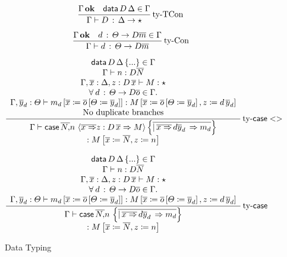 \begin{figure}
\[
\frac{\Gamma\,\mathbf{ok}\quad\mathsf{data}\,D\,\Delta\in\Gamma}{\Gamma\vdash D\,:\,\Delta\rightarrow\star}\operatorname{ty-TCon}
\]

\[
\frac{\Gamma\,\mathbf{ok}\quad d\,:\,\varTheta\rightarrow D\overline{m}\in\Gamma}{\Gamma\vdash d\,:\,\varTheta\rightarrow D\overline{m}}\operatorname{ty-Con}
\]

\[
\frac{\begin{array}{c}
\mathsf{data}\,D\,\Delta\left\{ ...\right\} \in\Gamma\\
\Gamma\vdash n:D\overline{N}\\
\Gamma,\overline{x}:\Delta,z:D\,\overline{x}\vdash M:\star\\
\forall\:d\,:\,\varTheta\rightarrow D\overline{o}\in\Gamma.\\
\Gamma,\overline{y}_{d}:\varTheta\vdash m_{d}\left[\overline{x}\coloneqq\overline{o}\left[\varTheta\coloneqq\overline{y}_{d}\right]\right]:M\left[\overline{x}\coloneqq\overline{o}\left[\varTheta\coloneqq\overline{y}_{d}\right],z\coloneqq d\,\overline{y}_{d}\right]\\
\mathrm{No\ duplicate\ branches}
\end{array}}{\begin{array}{c}
\Gamma\vdash \mathsf{case}{} \,\overline{N,}n\,\left\langle \overline{x\Rightarrow}z:D\,\overline{x}\Rightarrow M\right\rangle \left\{ \overline{|\,\overline{x\Rightarrow}\,d\overline{y}_{d}\,\Rightarrow m_{d}}\right\} \\
:M\left[\overline{x}\coloneqq\overline{N},z\coloneqq n\right]
\end{array}
}\operatorname{ty-\mathsf{case}{}<>} 
\]

\[
\frac{\begin{array}{c}
\mathsf{data}\,D\,\Delta\left\{ ...\right\} \in\Gamma\\
\Gamma\vdash n:D\overline{N}\\
\Gamma,\overline{x}:\Delta,z:D\,\overline{x}\vdash M:\star\\
\forall\:d\,:\,\varTheta\rightarrow D\overline{o}\in\Gamma.\\
\Gamma,\overline{y}_{d}:\varTheta\vdash m_{d}\left[\overline{x}\coloneqq\overline{o}\left[\varTheta\coloneqq\overline{y}_{d}\right]\right]:M\left[\overline{x}\coloneqq\overline{o}\left[\varTheta\coloneqq\overline{y}_{d}\right],z\coloneqq d\,\overline{y}_{d}\right]
\end{array}}{\begin{array}{c}
\Gamma\vdash \mathsf{case}{} \,\overline{N,}n\,\left\{ \overline{|\,\overline{x\Rightarrow}\,d\overline{y}_{d}\,\Rightarrow m_{d}}\right\} \\
:M\left[\overline{x}\coloneqq\overline{N},z\coloneqq n\right]
\end{array}
}\operatorname{ty-\mathsf{case}{}}
\]

\caption{\SLang{} Data Typing}
\label{fig:surface-data-ty}
\end{figure}


